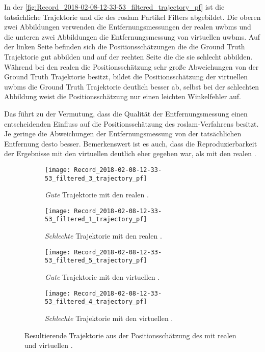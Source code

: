 In der \autoref{fig:Record_2018-02-08-12-33-53_filtered_trajectory_pf} ist die tatsächliche Trajektorie und die des \gls{roslam} Partikel Filters abgebildet. Die oberen zwei Abbildungen verwenden die Entfernungsmessungen der realen \glspl{uwbm} und die unteren zwei Abbildungen die Entfernungsmessung von virtuellen \glspl{uwbm}. Auf der linken Seite befinden sich die Positionsschätzungen die die Ground Truth Trajektorie gut abbilden und auf der rechten Seite die die sie schlecht abbilden. Während bei den realen  die Positionsschätzung sehr große Abweichungen von der Ground Truth Trajektorie besitzt, bildet die Positionsschätzung der virtuellen \glspl{uwbm} die Ground Truth Trajektorie deutlich besser ab, selbst bei der schlechten Abbildung weist die Positionsschätzung nur einen leichten Winkelfehler auf.

Das führt zu der Vermutung, dass die Qualität der Entfernungsmessung einen entscheidenden Einfluss auf die Positionsschätzung des \gls{roslam}-Verfahrens besitzt. Je geringe die Abweichungen der Entfernungsmessung von der tatsächlichen Entfernung desto besser. Bemerkenswert ist es auch, dass die Reproduzierbarkeit der Ergebnisse mit den virtuellen  deutlich eher gegeben war, als mit den realen .

\begin{figure}
	\centering
	\begin{subfigure}{0.49\linewidth}
		\centering
		\texttt{[image: Record\_2018-02-08-12-33-53\_filtered\_3\_trajectory\_pf]}
		\caption{\textit{Gute} Trajektorie mit den realen .}
		\label{fig:Record_2018-02-08-12-33-53_filtered_3_trajectory_pf}
	\end{subfigure}
	\hfill
	\begin{subfigure}{0.49\linewidth}
		\centering
		\texttt{[image: Record\_2018-02-08-12-33-53\_filtered\_1\_trajectory\_pf]}
		\caption{\textit{Schlechte} Trajektorie mit den realen .}
		\label{fig:Record_2018-02-08-12-33-53_filtered_1_trajectory_pf}
	\end{subfigure}
	\par
	\bigskip
	\begin{subfigure}{0.49\linewidth}
		\centering
		\texttt{[image: Record\_2018-02-08-12-33-53\_filtered\_5\_trajectory\_pf]}
		\caption{\textit{Gute} Trajektorie mit den virtuellen .}
		\label{fig:Record_2018-02-08-12-33-53_filtered_5_trajectory_pf}
	\end{subfigure}
	\hfill
	\begin{subfigure}{0.49\linewidth}
		\centering
		\texttt{[image: Record\_2018-02-08-12-33-53\_filtered\_4\_trajectory\_pf]}
		\caption{\textit{Schlechte} Trajektorie mit den virtuellen .}
		\label{fig:Record_2018-02-08-12-33-53_filtered_4_trajectory_pf}
	\end{subfigure}
	\caption{Resultierende Trajektorie aus der Positionsschätzung des  mit realen und virtuellen .}
	\label{fig:Record_2018-02-08-12-33-53_filtered_trajectory_pf}
\end{figure}


